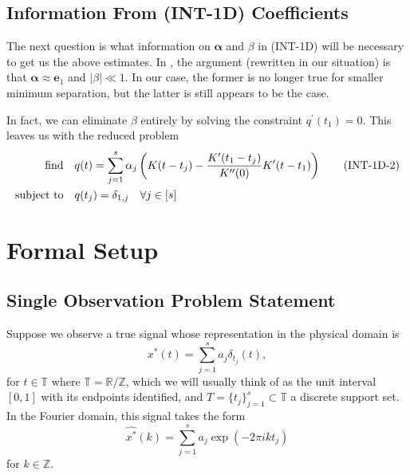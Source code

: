 \documentclass[11pt]{article}
\newcommand{\RR}{\mathbb{R}}
\newcommand{\TT}{\mathbb{T}}
\newcommand{\ZZ}{\mathbb{Z}}
\newcommand{\HS}{\hspace{3.5mm}}
\newcommand{\balpha}{\bm \alpha}
\newcommand{\be}{\bm e}
\newcounter{para}
\begin{document}
\subsection{Information From (INT-1D) Coefficients}

The next question is what information on $\balpha$ and $\beta$ in (INT-1D) will be necessary to get us the above estimates.
In \cite{fernandez2016super}, the argument (rewritten in our situation) is that $\balpha \approx \be_1$ and $|\beta| \ll 1$.
In our case, the former is no longer true for smaller minimum separation, but the latter is still appears to be the case.

In fact, we can eliminate $\beta$ entirely by solving the constraint $q^\prime(t_1) = 0$.
This leaves us with the reduced problem
\begin{align*}
  \text{find} &\HS q(t) = \sum_{j = 1}^{s} \alpha_j \left(K(t - t_j) - \frac{K^{\prime}(t_1 - t_j)}{K^{\prime\prime}(0)}K^\prime(t - t_1)\right) \tag{\text{INT-1D-2}} \\
  \text{subject to}
              &\HS q(t_j) = \delta_{1,j} \HS \forall j \in [s]
\end{align*}

\clearpage

\section{Formal Setup}

\subsection{Single Observation Problem Statement}

Suppose we observe a true signal whose representation in the physical domain is
\begin{equation}
    x^*(t) = \sum_{j = 1}^s a_j \delta_{t_j}(t),
\end{equation}
for $t \in \TT$ where $\TT = \RR / \ZZ$, which we will usually think of as the unit interval $[0, 1]$ with its endpoints identified, and $T = \{t_j\}_{j = 1}^s \subset \TT$ a discrete support set.
In the Fourier domain, this signal takes the form
\begin{equation}
    \widehat{x^*}(k) = \sum_{j = 1}^s a_j \exp(-2\pi i k t_j)
\end{equation}
for $k \in \ZZ$.
\end{document}
